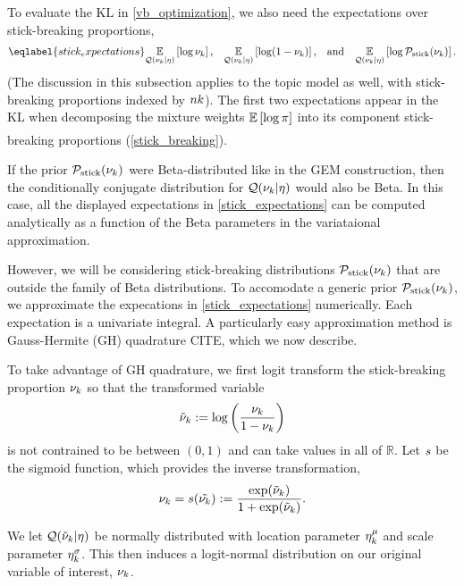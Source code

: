To evaluate the $\mathrm{KL}$ in \eqref{vb_optimization}, we also need
the expectations over stick-breaking proportions,
\begin{align}\eqlabel{stick_expectations}
%
\expect{\q(\nuk \vert \eta)}{\log \nuk}
\textrm{,}\quad
\expect{\q(\nuk \vert \eta)}{\log (1 - \nuk)}
\textrm{,}\quad\textrm{and}\quad
\expect{\q(\nuk \vert \eta)}{\log \pstick(\nuk)}.
%
\end{align}
(The discussion in this subsection applies to the topic model as well,
with stick-breaking proportions indexed by $nk$).
The first two expectations appear in the $\mathrm{KL}$
when decomposing the mixture weights
$\underset{}{\mathbb{E}}\left[\log \pi\right]$ into its component stick-breaking proportions (\eqref{stick_breaking}).

If the prior $\mathcal{P}_{\mathrm{stick}}(\nu_{k})$ were Beta-distributed like in the GEM construction,
then the conditionally conjugate distribution for $\mathcal{Q}(\nu_{k} \vert \eta)$ would also be Beta.
In this case, all the displayed expectations in \eqref{stick_expectations}
can be computed analytically as a function of
the Beta parameters in the variataional approximation.

However, we will be considering stick-breaking distributions $\mathcal{P}_{\mathrm{stick}}(\nu_{k})$ that
are outside the family of Beta distributions.
To accomodate a generic prior $\mathcal{P}_{\mathrm{stick}}(\nu_{k})$,
we approximate the expecations in \eqref{stick_expectations} numerically.
Each expectation is a univariate integral.
A particularly easy approximation method is
Gauss-Hermite (GH) quadrature CITE, which we now describe.

To take advantage of GH quadrature, we first logit transform the stick-breaking
proportion $\nu_{k}$ so that the transformed variable
\begin{align*}
  \tilde{\nu}_{k} := \log\left(\frac{\nu_{k}}{1 - \nu_{k}}\right)
\end{align*}
is not contrained to be between $(0, 1)$ and can take values in all of $\mathbb{R}$.
Let $s$ be the sigmoid function,
which provides the inverse transformation,
\begin{align*}
  \nu_{k} = s(\tilde{\nu_{k}}) := \frac{\exp(\tilde{\nu}_k)}{1 + \exp(\tilde{\nu}_k)}.
\end{align*}

We let $\mathcal{Q}(\tilde{\nu}_k \vert \eta)$ be normally distributed with
location parameter $\eta^{\mu}_k$ and scale parameter $\eta^{\sigma}_k$.
This then induces a logit-normal
distribution on our original variable of interest, $\nu_{k}$.

